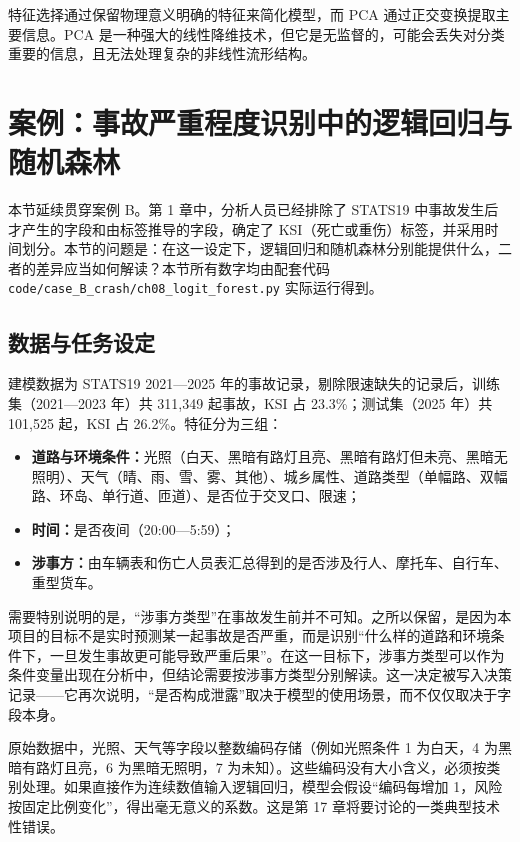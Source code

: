 特征选择通过保留物理意义明确的特征来简化模型，而 PCA 通过正交变换提取主要信息。PCA 是一种强大的线性降维技术，但它是无监督的，可能会丢失对分类重要的信息，且无法处理复杂的非线性流形结构。

\section{案例：事故严重程度识别中的逻辑回归与随机森林}
\label{sec:ch8_case}

本节延续贯穿案例 B。第 1 章中，分析人员已经排除了 STATS19 中事故发生后才产生的字段和由标签推导的字段，确定了 KSI（死亡或重伤）标签，并采用时间划分。本节的问题是：在这一设定下，逻辑回归和随机森林分别能提供什么，二者的差异应当如何解读？本节所有数字均由配套代码 \texttt{code/case\_B\_crash/ch08\_logit\_forest.py} 实际运行得到。

\subsection{数据与任务设定}

建模数据为 STATS19 2021—2025 年的事故记录\cite{dft2026stats19}，剔除限速缺失的记录后，训练集（2021—2023 年）共 311,349 起事故，KSI 占 23.3\%；测试集（2025 年）共 101,525 起，KSI 占 26.2\%。特征分为三组：

\begin{itemize}
  \item \textbf{道路与环境条件：}光照（白天、黑暗有路灯且亮、黑暗有路灯但未亮、黑暗无照明）、天气（晴、雨、雪、雾、其他）、城乡属性、道路类型（单幅路、双幅路、环岛、单行道、匝道）、是否位于交叉口、限速；
  \item \textbf{时间：}是否夜间（20:00—5:59）；
  \item \textbf{涉事方：}由车辆表和伤亡人员表汇总得到的是否涉及行人、摩托车、自行车、重型货车。
\end{itemize}

需要特别说明的是，“涉事方类型”在事故发生前并不可知。之所以保留，是因为本项目的目标不是实时预测某一起事故是否严重，而是识别“什么样的道路和环境条件下，一旦发生事故更可能导致严重后果”。在这一目标下，涉事方类型可以作为条件变量出现在分析中，但结论需要按涉事方类型分别解读。这一决定被写入决策记录——它再次说明，“是否构成泄露”取决于模型的使用场景，而不仅仅取决于字段本身。

原始数据中，光照、天气等字段以整数编码存储（例如光照条件 1 为白天，4 为黑暗有路灯且亮，6 为黑暗无照明，7 为未知）。这些编码没有大小含义，必须按类别处理。如果直接作为连续数值输入逻辑回归，模型会假设“编码每增加 1，风险按固定比例变化”，得出毫无意义的系数。这是第 17 章将要讨论的一类典型技术性错误。

